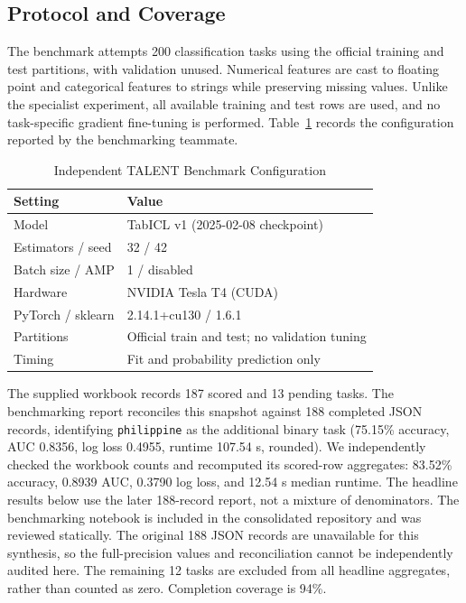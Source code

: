 \documentclass[conference]{IEEEtran}
\begin{document}
\subsection{Protocol and Coverage}
The benchmark attempts 200 classification tasks using the official training and test partitions, with validation unused. Numerical features are cast to floating point and categorical features to strings while preserving missing values. Unlike the specialist experiment, all available training and test rows are used, and no task-specific gradient fine-tuning is performed. Table~\ref{tab:talentconfig} records the configuration reported by the benchmarking teammate.
\begin{table}[t]
\caption{Independent TALENT Benchmark Configuration}
\label{tab:talentconfig}
\centering\footnotesize
\begin{tabular}{@{}lp{}@{}}\toprule
Setting & Value\\\midrule
Model & TabICL v1 (2025-02-08 checkpoint)\\
Estimators / seed & 32 / 42\\
Batch size / AMP & 1 / disabled\\
Hardware & NVIDIA Tesla T4 (CUDA)\\
PyTorch / sklearn & 2.14.1+cu130 / 1.6.1\\
Partitions & Official train and test; no validation tuning\\
Timing & Fit and probability prediction only\\\bottomrule
\end{tabular}
\end{table}

The supplied workbook records 187 scored and 13 pending tasks. The benchmarking report reconciles this snapshot against 188 completed JSON records, identifying \texttt{philippine} as the additional binary task (75.15\% accuracy, AUC 0.8356, log loss 0.4955, runtime 107.54 s, rounded). We independently checked the workbook counts and recomputed its scored-row aggregates: 83.52\% accuracy, 0.8939 AUC, 0.3790 log loss, and 12.54 s median runtime. The headline results below use the later 188-record report, not a mixture of denominators. The benchmarking notebook is included in the consolidated repository and was reviewed statically. The original 188 JSON records are unavailable for this synthesis, so the full-precision values and reconciliation cannot be independently audited here. The remaining 12 tasks are excluded from all headline aggregates, rather than counted as zero. Completion coverage is 94\%.
\end{document}
